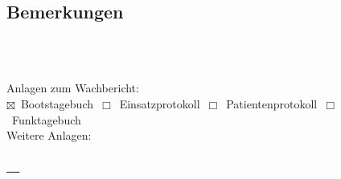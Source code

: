 \documentclass[a4paper, notitlepage, 10pt]{scrreprt}
\newcommand{\phantomspace}{\vphantom{A}}
\begin{document}
\newlength{\rescuesBoxHeight}
\setlength{\rescuesBoxHeight}{\ht\rescuesBox+\dp\rescuesBox}
\newlength{\resourcesBoxHeight}
\setlength{\resourcesBoxHeight}{\ht\resourcesBox+\dp\resourcesBox}
\newlength{\assignmentNumberBoxHeight}
\setlength{\assignmentNumberBoxHeight}{\ht\assignmentNumberBox+\dp\assignmentNumberBox}
\newlength{\resourcesBoxSepLength}
\setlength{\resourcesBoxSepLength}{5pt}
\newlength{\maxMinipageColHeight}
\setlength{\maxMinipageColHeight}{%
\maxof{\rescuesBoxHeight}{\resourcesBoxHeight+\assignmentNumberBoxHeight+\resourcesBoxSepLength}}
\begin{minipage}[c][\maxMinipageColHeight][t]{\linewidth}
\begin{minipage}[c][\maxMinipageColHeight][t]{0.45\linewidth}
\usebox{\rescuesBox}
\vfill
\end{minipage}
\hfill
\begin{minipage}[c][\maxMinipageColHeight][t]{0.45\linewidth}\raggedleft
\usebox{\resourcesBox}
\vspace{\resourcesBoxSepLength}\vfill
\usebox{\assignmentNumberBox}
\end{minipage}
\end{minipage}
\vspace{9pt}
\vfill

\begin{minipage}{\linewidth}
\subsection*{Bemerkungen}\vspace{-6pt}
\uline{\phantomspace\hfill\mbox{}\newline\phantomspace\hfill\mbox{}\newline\phantomspace\hfill%
\mbox{}\newline\phantomspace\hfill}
\end{minipage}
\\\\\vspace{-3pt}
\vfill

\begin{minipage}{\linewidth}
Anlagen zum Wachbericht:\vspace*{4pt}\\
\mbox{$\boxtimes$ Bootstagebuch \qquad\qquad $\Box$ Einsatzprotokoll \hphantom{(\texttimes\,0)}\qquad\qquad $\Box$
Patientenprotokoll \hphantom{(\texttimes\,0)}\qquad\qquad $\Box$ Funktagebuch \hphantom{(\texttimes\,0)}}
\vspace*{-5pt}\\
Weitere Anlagen:\\\\[-11pt]
\hphantom{X}\uline{\mbox{}\,\mbox{\hspace{200pt}}\ \ \mbox{}}
\end{minipage}
\vspace{-13pt}
\end{document}
